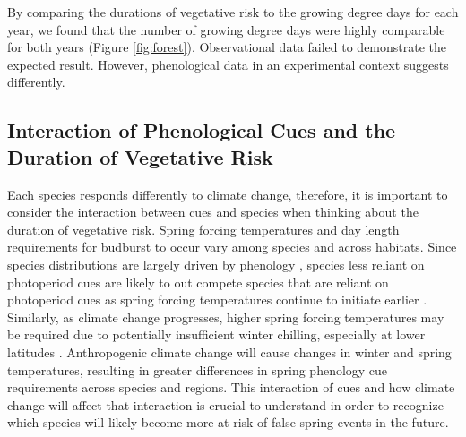 \documentclass{article}\usepackage[]{graphicx}\usepackage[]{color}
\begin{document}
By comparing the durations of vegetative risk to the growing degree days for each year, we found that the number of growing degree days were highly comparable for both years (Figure \ref{fig:forest}). Observational data failed to demonstrate the expected result. However, phenological data in an experimental context suggests differently. %

\subsection{Interaction of Phenological Cues and the Duration of Vegetative Risk}
Each species responds differently to climate change, therefore, it is important to consider the interaction between cues and species when thinking about the duration of vegetative risk. Spring forcing temperatures and day length requirements for budburst to occur vary among species and across habitats. Since species distributions are largely driven by phenology \citep{Chuine2001}, species less reliant on photoperiod cues are likely to out compete species that are reliant on photoperiod cues as spring forcing temperatures continue to initiate earlier \citep{Vitasse2011, Gauzere2017}. Similarly, as climate change progresses, higher spring forcing temperatures may be required due to potentially insufficient winter chilling, especially at lower latitudes \citep{McCreary1990, Morin2009, Fu2012, Polgar2014, Chuine2010}. Anthropogenic climate change will cause changes in winter and spring temperatures, resulting in greater differences in spring phenology cue requirements across species and regions. This interaction of cues and how climate change will affect that interaction is crucial to understand in order to recognize which species will likely become more at risk of false spring events in the future.
\end{document}
